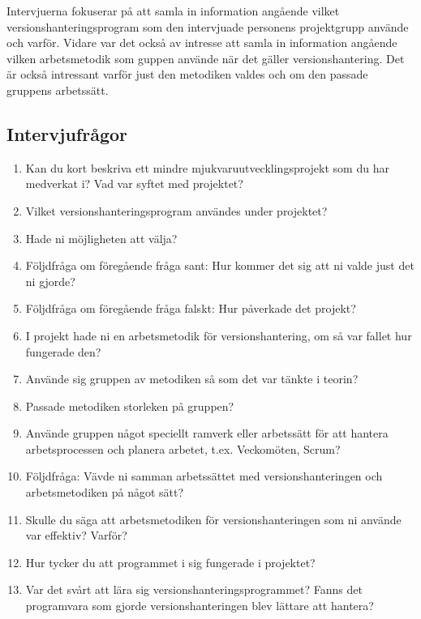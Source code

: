 Intervjuerna fokuserar på att samla in information angående vilket versionshanteringsprogram som den intervjuade personens projektgrupp använde och varför. Vidare var det också av intresse att samla in information angående vilken arbetsmetodik som guppen använde när det gäller versionshantering. Det är också intressant varför just den metodiken valdes och om den passade gruppens arbetssätt.

\subsection{ Intervjufrågor } \vspace{1em}
\begin{enumerate}

  \item Kan du kort beskriva ett mindre mjukvaruutvecklingsprojekt som du har medverkat i? Vad var syftet med projektet?

  \item Vilket versionshanteringsprogram användes under projektet?

  \item Hade ni möjligheten att välja?

  \item Följdfråga om föregående fråga sant: Hur kommer det sig att ni valde just det ni gjorde?
  \item Följdfråga om föregående fråga falskt: Hur påverkade det projekt?

  \item I projekt hade ni en arbetsmetodik för versionshantering, om så var fallet hur fungerade den?

  \item Använde sig gruppen av metodiken så som det var tänkte i teorin?

  \item Passade metodiken storleken på gruppen?

  \item Använde gruppen något speciellt ramverk eller arbetssätt för att hantera arbetsprocessen och planera arbetet, t.ex. Veckomöten, Scrum?

  \item Följdfråga: Vävde ni samman arbetssättet med versionshanteringen och arbetsmetodiken på något sätt?

  \item Skulle du säga att arbetsmetodiken för versionshanteringen som ni använde var effektiv? Varför?

  \item Hur tycker du att programmet i sig fungerade i projektet?

  \item Var det svårt att lära sig versionshanteringsprogrammet? Fanns det programvara som gjorde versionshanteringen blev lättare att hantera?

\end{enumerate}

